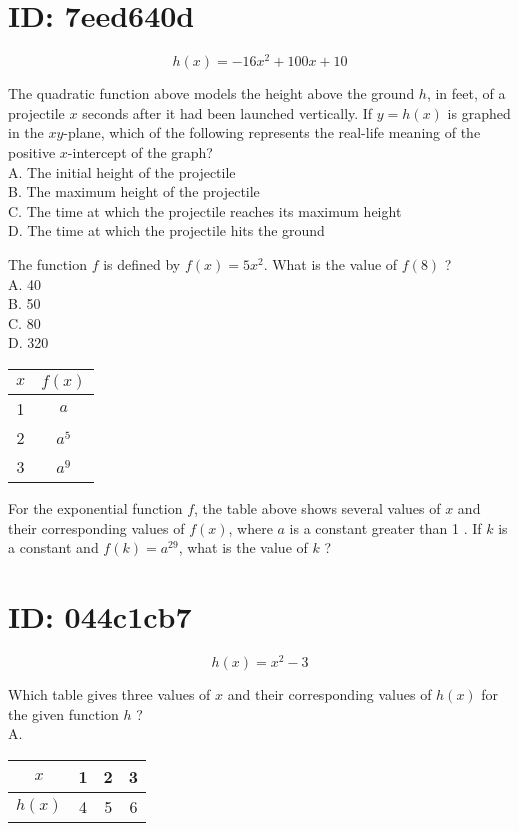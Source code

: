 \section*{ID: 7eed640d}
$$
h(x)=-16 x^{2}+100 x+10
$$

The quadratic function above models the height above the ground $h$, in feet, of a projectile $x$ seconds after it had been launched vertically. If $y=h(x)$ is graphed in the $x y$-plane, which of the following represents the real-life meaning of the positive $x$-intercept of the graph?\\
A. The initial height of the projectile\\
B. The maximum height of the projectile\\
C. The time at which the projectile reaches its maximum height\\
D. The time at which the projectile hits the ground

The function $f$ is defined by $f(x)=5 x^{2}$. What is the value of $f(8)$ ?\\
A. 40\\
B. 50\\
C. 80\\
D. 320

\begin{center}
\begin{tabular}{|c|c|}
\hline
$x$ & $f(x)$ \\
\hline
1 & $a$ \\
\hline
2 & $a^{5}$ \\
\hline
3 & $a^{9}$ \\
\hline
\end{tabular}
\end{center}

For the exponential function $f$, the table above shows several values of $x$ and their corresponding values of $f(x)$, where $a$ is a constant greater than 1 . If $k$ is a constant and $f(k)=a^{29}$, what is the value of $k$ ?

\section*{ID: 044c1cb7}
$$
h(x)=x^{2}-3
$$

Which table gives three values of $x$ and their corresponding values of $h(x)$ for the given function $h$ ?\\
A.

\begin{center}
\begin{tabular}{|c|c|c|c|}
\hline
$x$ & 1 & 2 & 3 \\
\hline
$h(x)$ & 4 & 5 & 6 \\
\hline
\end{tabular}
\end{center}

